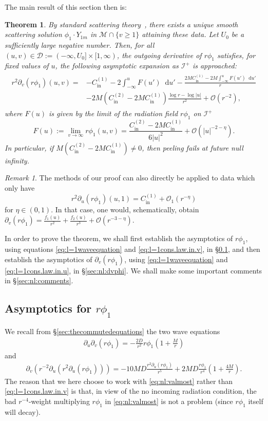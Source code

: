 \documentclass[11pt,english]{article}
\numberwithin{equation}{section}
\newtheorem{thm}{Theorem}[section]
\theoremstyle{remark}
\newtheorem{rem}{Remark}[section]
\theoremstyle{plain}
\theoremstyle{remark}
\newcommand{\dd}{\mathop{}\!\mathrm{d}}
\newcommand{\pu}{\partial_u}
\newcommand{\pv}{\partial_v}
\renewcommand{\(}{\left(}
\renewcommand{\)}{\right)}
\newcommand{\cc}{C_{\mathrm{in}}^{(1)}}
\newcommand{\ccc}{C_{\mathrm{in}}^{(2)}}
\newcommand{\pho}{(r\phi_1)}
\begin{document}
The main result of this section then is:
\begin{thm}\label{thm:nl}
By standard scattering theory~\cite{DRSR18}, there exists a unique smooth scattering solution $\phi_1\cdot Y_{1m}$ in $\mathcal M\cap\{v\geq 1\}$ attaining these data.
Let $U_0$ be a sufficiently large negative number. Then, for all $(u,v)\in\mathcal{D}:=(-\infty,U_0]\times [1,\infty)$, the outgoing derivative of $r\phi_1$ satisfies, for fixed values of $u$, the following asymptotic expansion as $\mathcal{I}^+$ is approached:
\begin{align}
\begin{split}
r^2\pv\pho(u,v)=&-\cc-2\int_{-\infty}^uF(u')\dd u'-\frac{2M\cc-2M\int_{-\infty}^uF(u')\dd u'}{r}\\
&-2M(\ccc-2M\cc)\frac{\log r-\log|u|}{r^2}+\mathcal{O}(r^{-2}),
\end{split}
\end{align}
where $F(u)$ is given by the limit of the radiation field $r\phi_1$ on $\mathcal{I}^+$
\begin{equation}
F(u):=\lim_{v\to\infty}r\phi_1(u,v)=\frac{\ccc-2M\cc}{6|u|^2}+\mathcal{O}(|u|^{-2-\eta}).
\end{equation}
In particular, if $M(\ccc-2M\cc)\neq 0$, then peeling fails at future null infinity.
\end{thm}
\begin{rem}
The methods of our proof can also directly be  applied to data which only have 
\[r^2\pu\pho(u,1)=C_{\mathrm{in}}^{(1)}+\mathcal{O}_1(r^{-\eta})\]
for $\eta\in(0,1)$. In that case, one would, schematically, obtain $\pv\pho=\frac{f_1(u)}{r^2}+\frac{f_2(u)}{r^3}+\mathcal{O}(r^{-3-\eta})$.
\end{rem}
In order to prove the theorem, we shall first establish the asymptotics of $r\phi_1$, using equations \eqref{eq:l=1waveequation} and \eqref{eq:l=1cons.law.in.v}, in \S\ref{sec:nl:phi}, and then establish the asymptotics of $\pv(r\phi_1)$, using \eqref{eq:l=1waveequation} and \eqref{eq:l=1cons.law.in.u}, in \S\ref{sec:nl:dvphi}. 
We shall make some important comments in \S\ref{sec:nl:comments}.

\subsection{Asymptotics for \texorpdfstring{$r\phi_1$}{r phi1}}\label{sec:nl:phi}
We recall from \S \ref{sec:thecommutedequations} the two wave equations
\begin{align}\label{eq:nl:waveequation}
\pu\pv(r\phi_1)=-\frac{2D}{r^2}r\phi_1\left(1+\frac{M}{r}\right)
\end{align}
and
\begin{align}\label{eq:nl:valmost}
\pv(r^{-2}\pu(r^2\pu(r\phi_1)))=-10 MD\frac{r^2\pu(r\phi_1)}{r^5}+2MD\frac{r\phi_1}{r^4}\left(1+\frac{4M}{r}\right).
\end{align}
The reason that we here choose to work with \eqref{eq:nl:valmost} rather than \eqref{eq:l=1cons.law.in.v} is that, in view of the no incoming radiation condition, the bad $r^{-4}$-weight multiplying $r\phi_1$ in \eqref{eq:nl:valmost} is not a problem (since  $r\phi_1$ itself will decay).
\end{document}
